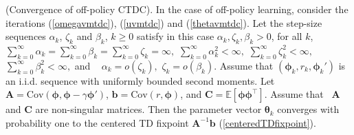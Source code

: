 \begin{theorem}
 \label{theorem2}(Convergence of off-policy CTDC).
 In the case of off-policy learning, consider the iterations (\ref{omegavmtdc}), (\ref{uvmtdc}) and (\ref{thetavmtdc}).
 Let the step-size sequences $\alpha_k$, $\zeta_k$ and $\beta_k$, $k\geq 0$ satisfy in this case $\alpha_k,\zeta_k,\beta_k>0$, for all $k$,
 $
 \sum_{k=0}^{\infty}\alpha_k=\sum_{k=0}^{\infty}\beta_k=\sum_{k=0}^{\infty}\zeta_k=\infty,
 $
 $
 \sum_{k=0}^{\infty}\alpha_k^2<\infty,
 $
 $
 \sum_{k=0}^{\infty}\zeta_k^2<\infty,
 $
 $
 \sum_{k=0}^{\infty}\beta_k^2<\infty,
 $
 and  
 $
 \alpha_k = o(\zeta_k),
 $
 $
 \zeta_k = o(\beta_k).
 $
 Assume that $(\bm{\bm{\phi}}_k,r_k,\bm{\bm{\phi}}_k')$ is an i.i.d. sequence with
 uniformly bounded second moments.
 Let $\textbf{A} = \mathrm{Cov}(\bm{\bm{\phi}},\bm{\bm{\phi}}-\gamma\bm{\bm{\phi}}')$,
 $\bm{b}=\mathrm{Cov}(r,\bm{\bm{\phi}})$, and $\textbf{C}=\mathbb{E}[\bm{\bm{\phi}}\bm{\bm{\phi}}^{\top}]$.
 Assume that  $\textbf{A}$ and $\textbf{C}$ are non-singular matrices. 
 Then the parameter vector $\bm{\bm{\theta}}_k$ converges with probability one 
 to the centered TD fixpoint $\textbf{A}^{-1}\bm{b}$ (\ref{centeredTDfixpoint}).
\end{theorem}
